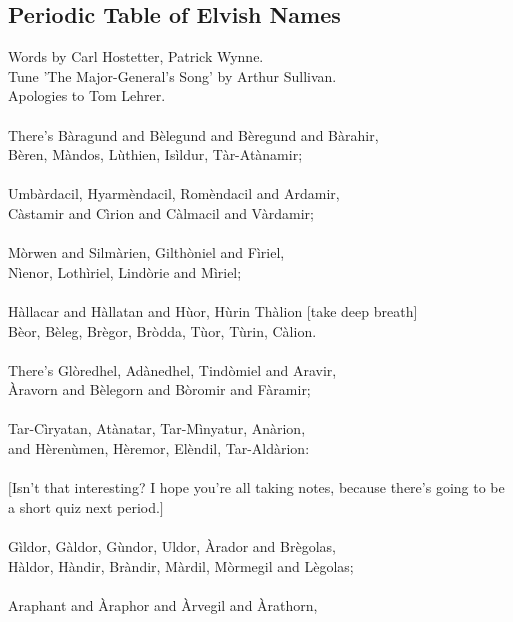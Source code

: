 \begin{multicols}{2}
\section{Periodic Table of Elvish Names}
Words by Carl Hostetter, Patrick Wynne.
\\Tune ’The Major-General’s Song’ by Arthur Sullivan.
\\Apologies to Tom Lehrer.
\\
\\
There’s B\`aragund and B\`elegund and B\`eregund and B\`arahir,
\\
B\`eren, M\`andos, L\`uthien, Is\`ildur, T\`ar-At\`anamir;
\\
\\
Umb\`ardacil, Hyarm\`endacil, Rom\`endacil and Ardamir, 
\\
C\`astamir and C\`irion and C\`almacil and V\`ardamir;
\\
\\
M\`orwen and Silm\`arien, Gilth\`oniel and F\`iriel,
\\
N\`ienor, Loth\`iriel, Lind\`orie and M\`iriel;
\\
\\
H\`allacar and H\`allatan and H\`uor, H\`urin Th\`alion [take deep breath]
\\
B\`eor, B\`eleg, Br\`egor, Br\`odda, T\`uor, T\`urin, C\`alion.
\\
\\
There’s Gl\`oredhel, Ad\`anedhel, Tind\`omiel and Aravir, 
\\
\`Aravorn and B\`elegorn and B\`oromir and F\`aramir; \`
\\
\\
Tar-C\`iryatan, At\`anatar, Tar-M\`inyatur, An\`arion,
\\
and H\`eren\`umen, H\`eremor, El\`endil, Tar-Ald\`arion:
\\
\\
$\lbrack$Isn't that interesting? I hope you're all taking notes, because there's  going to be a short quiz next period.$\rbrack$
\\
\\
G\`ildor, G\`aldor, G\`undor, Uldor, \` Arador and Br\`egolas, \`
\\
H\`aldor, H\`andir, Br\`andir, M\`ardil, M\`ormegil and L\`egolas;
\\
\\
Araphant and \` Araphor and \` Arvegil and \` Arathorn, \`
\\

\end{multicols}
